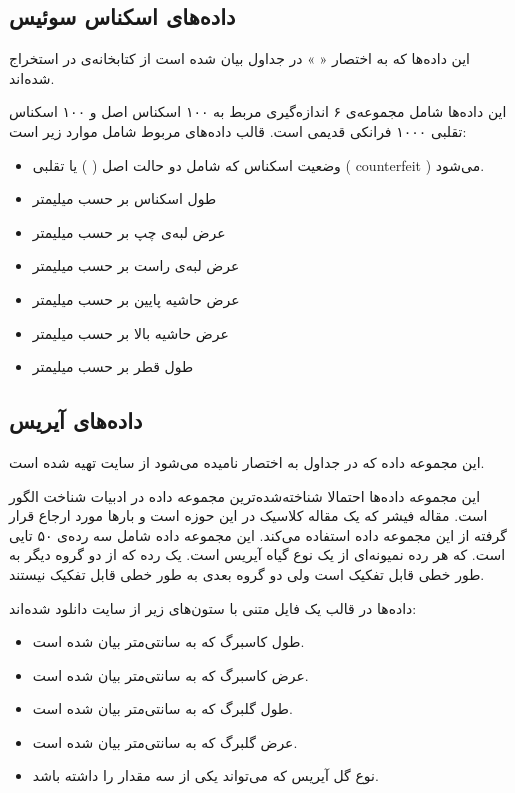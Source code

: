 \subsection{
داده‌های اسکناس سوئیس
}

این داده‌ها که به اختصار «
» در جداول بیان شده است از کتابخانه‌ی 
\cite{rmclust}
در 
استخراج شده‌اند.

این داده‌ها شامل مجموعه‌ی ۶ اندازه‌گیری مربط به ۱۰۰ اسکناس اصل و ۱۰۰ اسکناس تقلبی ۱۰۰۰ فرانکی قدیمی است. قالب داده‌های مربوط شامل موارد زیر است:

\begin{itemize}
\item
{}
وضعیت اسکناس که شامل دو حالت اصل (%
%
)
یا تقلبی (%
counterfeit%
) می‌شود.
\item
{}
طول اسکناس بر حسب میلیمتر
\item
{}
عرض لبه‌ی چپ بر حسب میلیمتر
\item
{}
عرض لبه‌ی راست بر حسب میلیمتر
\item
{}
عرض حاشیه پایین بر حسب میلیمتر
\item
{}
عرض حاشیه بالا بر حسب میلیمتر
\item
{}
طول قطر بر حسب میلیمتر
\end{itemize}

\subsection{
داده‌های آیریس
}

این مجموعه داده که در جداول به اختصار 
نامیده می‌شود از سایت 
\cite{uci_iris}
تهیه شده است.

این مجموعه داده‌ها احتمالا شناخته‌شده‌ترین مجموعه داده در ادبیات شناخت الگور%
است. مقاله فیشر که یک مقاله کلاسیک در این حوزه است و بارها مورد ارجاع قرار گرفته از این مجموعه داده استفاده می‌کند. این مجموعه داده شامل سه رده‌ی ۵۰ تایی است. که هر رده نمیونه‌ای از یک نوع گیاه آیریس است. یک رده که از دو گروه دیگر به طور خطی قابل تفکیک است ولی دو گروه بعدی به طور خطی قابل تفکیک نیستند.

داده‌ها در قالب یک فایل متنی با ستون‌های زیر از سایت 
دانلود شده‌اند:

\begin{itemize}
\item
{}
طول کاسبرگ که به سانتی‌متر بیان شده است.
\item
{}
عرض کاسبرگ که به سانتی‌متر بیان شده است.
\item
{}
طول گلبرگ که به سانتی‌متر بیان شده است.
\item
{}
عرض گلبرگ که به سانتی‌متر بیان شده است.
\item
{}
نوع گل آیریس که می‌تواند یکی از سه مقدار 
را داشته باشد.
\end{itemize}

